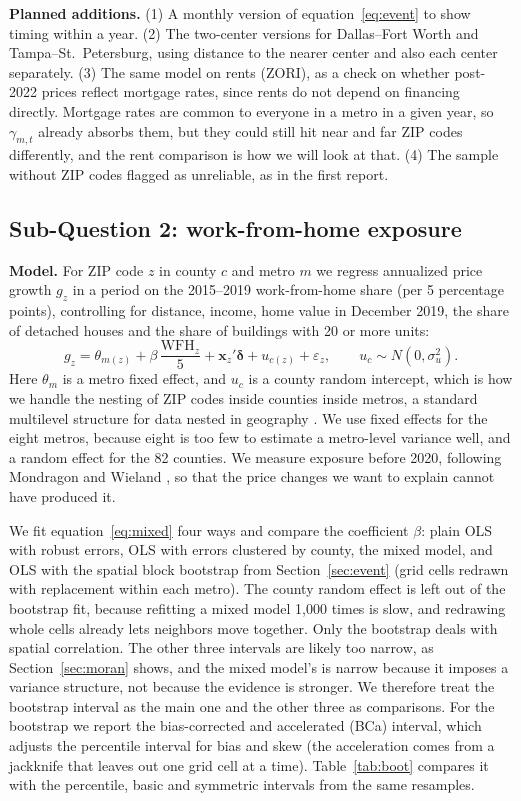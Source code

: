 \documentclass[11pt]{article}
\begin{document}
\textbf{Planned additions.} (1) A monthly version of equation~\eqref{eq:event} to show timing within a year. (2) The two-center
versions for Dallas--Fort Worth and Tampa--St.\ Petersburg, using distance to the nearer center and also each center separately.
(3) The same model on rents (ZORI), as a check on whether post-2022 prices reflect mortgage rates, since rents do not depend on
financing directly. Mortgage rates are common to everyone in a metro in a given year, so $\gamma_{m,t}$ already absorbs them,
but they could still hit near and far ZIP codes differently, and the rent comparison is how we will look at that. (4) The sample
without ZIP codes flagged as unreliable, as in the first report.

\subsection{Sub-Question 2: work-from-home exposure}
\label{sec:exposure}

\textbf{Model.} For ZIP code $z$ in county $c$ and metro $m$ we regress annualized price growth $g_z$ in a period on the 2015--2019
work-from-home share (per 5 percentage points), controlling for distance, income, home value in December 2019, the share of
detached houses and the share of buildings with 20 or more units:
\begin{equation}
g_z = \theta_{m(z)} + \beta\,\frac{\mathrm{WFH}_z}{5} + \mathbf{x}_z'\boldsymbol{\delta} + u_{c(z)} + \varepsilon_z,
\qquad u_c \sim N(0,\sigma_u^2).
\label{eq:mixed}
\end{equation}
Here $\theta_m$ is a metro fixed effect, and $u_c$ is a county random intercept, which is how we handle the nesting of ZIP codes
inside counties inside metros, a standard multilevel structure for data nested in geography \cite{gelman}. We use fixed effects for the eight metros, because eight is too few to estimate a metro-level variance well, and
a random effect for the 82 counties. We measure exposure before 2020, following Mondragon and Wieland \cite{mondragon}, so
that the price changes we want to explain cannot have produced it.

We fit equation~\eqref{eq:mixed} four ways and compare the coefficient $\beta$: plain OLS with robust errors, OLS with errors
clustered by county, the mixed model, and OLS with the spatial block bootstrap from Section~\ref{sec:event} (grid cells redrawn with
replacement within each metro). The county random effect is left out of the bootstrap fit, because refitting a mixed model 1,000
times is slow, and redrawing whole cells already lets neighbors move together. Only the bootstrap deals with spatial correlation.
The other three intervals are likely too narrow, as Section~\ref{sec:moran} shows, and the mixed model's is narrow because it
imposes a variance structure, not because the evidence is stronger. We therefore treat the bootstrap interval as the main one and
the other three as comparisons. For the bootstrap we report the bias-corrected and accelerated (BCa) interval, which adjusts the
percentile interval for bias and skew (the acceleration comes from a jackknife that leaves out one grid cell at a time).
Table~\ref{tab:boot} compares it with the percentile, basic and symmetric intervals from the same resamples.
\end{document}
